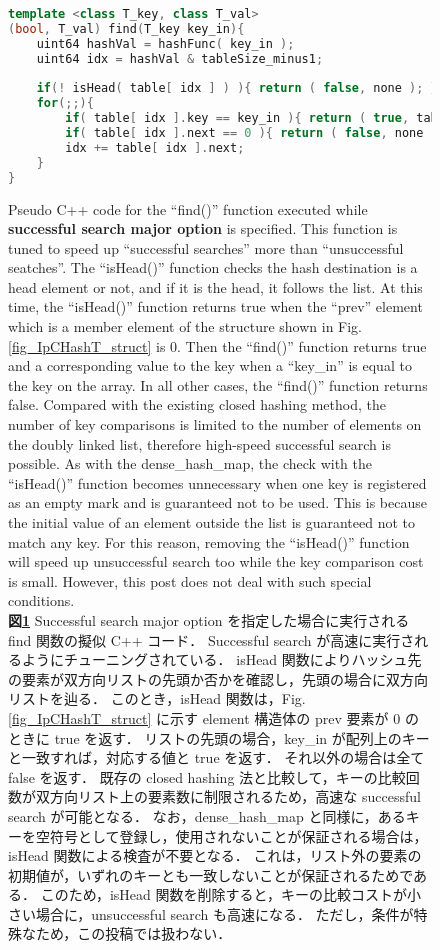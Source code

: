 \begin{figure}%
\begin{lstlisting}[language=C++]
template <class T_key, class T_val>
(bool, T_val) find(T_key key_in){
	uint64 hashVal = hashFunc( key_in );
	uint64 idx = hashVal & tableSize_minus1;
	
	if(! isHead( table[ idx ] ) ){ return ( false, none ); }
	for(;;){
		if( table[ idx ].key == key_in ){ return ( true, table[ idx ].val ); }
		if( table[ idx ].next == 0 ){ return ( false, none ); }
		idx += table[ idx ].next;
	}
}
\end{lstlisting}
\caption{
  Pseudo C++ code for the ``find()'' function executed while {\bf successful search major option} is specified.
  This function is tuned to speed up ``successful searches'' more than ``unsuccessful seatches''.
  The ``isHead()'' function checks the hash destination is a head element or not, and if it is the head, it follows the list.
  At this time, the ``isHead()'' function returns true
  when the ``prev'' element which is a member element of the structure shown in Fig. \ref{fig_IpCHashT_struct} is $0$.
  Then the ``find()'' function returns true and a corresponding value to the key when a ``key\_in'' is equal to the key on the array.
  In all other cases, the ``find()'' function returns false.
  Compared with the existing closed hashing method,
  the number of key comparisons is limited to the number of elements on the doubly linked list,
  therefore high-speed successful search is possible.
  As with the dense\_hash\_map,
  the check with the ``isHead()'' function becomes unnecessary
  when one key is registered as an empty mark and is guaranteed not to be used.
  This is because the initial value of an element outside the list is guaranteed not to match any key.
  For this reason, removing the ``isHead()'' function will speed up unsuccessful search too while the key comparison cost is small.
  However, this post does not deal with such special conditions.
  \\
  {\bf 図\ref{alg_find_sm}}
  Successful search major option を指定した場合に実行される find 関数の擬似 C++ コード．
  Successful search が高速に実行されるようにチューニングされている．
  isHead 関数によりハッシュ先の要素が双方向リストの先頭か否かを確認し，先頭の場合に双方向リストを辿る．
  このとき，isHead 関数は，Fig. \ref{fig_IpCHashT_struct} に示す element 構造体の prev 要素が 0 のときに true を返す．
  リストの先頭の場合，key\_in が配列上のキーと一致すれば，対応する値と true を返す．
  それ以外の場合は全て false を返す．
  既存の closed hashing 法と比較して，キーの比較回数が双方向リスト上の要素数に制限されるため，高速な successful search が可能となる．
  なお，dense\_hash\_map と同様に，あるキーを空符号として登録し，使用されないことが保証される場合は，isHead 関数による検査が不要となる．
  これは，リスト外の要素の初期値が，いずれのキーとも一致しないことが保証されるためである．
  このため，isHead 関数を削除すると，キーの比較コストが小さい場合に，unsuccessful search も高速になる．
  ただし，条件が特殊なため，この投稿では扱わない．
}
\label{alg_find_sm}
\end{figure}

